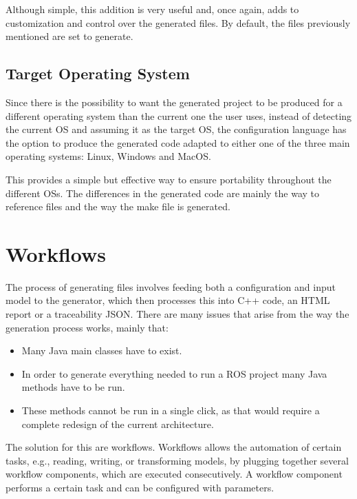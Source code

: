 Although simple, this addition is very useful and, once again, adds to customization and control over the generated files. By default, the files previously mentioned are set to generate.


\subsection{Target Operating System}
\label{sec:impl_os}

Since there is the possibility to want the generated project to be produced for a different operating system than the current one the user uses, instead of detecting the current \gls{OS} and assuming it as the target \gls{OS}, the configuration language has the option to produce the generated code adapted to either one of the three main operating systems: Linux, Windows and MacOS.

This provides a simple but effective way to ensure portability throughout the different \glspl{OS}.
The differences in the generated code are mainly the way to reference files and the way the make file is generated. 






\section{Workflows}
\label{sec:workflows}

The process of generating files involves feeding both a configuration and input model to the generator, which then processes this into C++ code, an \gls{HTML} report or a traceability \gls{JSON}. There are many issues that arise from the way the generation process works, mainly that:

\begin{itemize} 
	\item Many Java main classes have to exist.
	\item In order to generate everything needed to run a \gls{ROS} project many Java methods have to be run.
	\item These methods cannot be run in a single click, as that would require a complete redesign of the current architecture.
\end{itemize}


The solution for this are workflows. Workflows allows the automation of certain tasks, e.g., reading, writing, or transforming models, by plugging together several workflow components, which are executed consecutively. A workflow component performs a certain task and can be configured with parameters.


